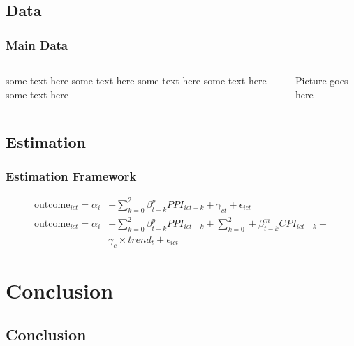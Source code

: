 \documentclass[11pt, aspectratio=169]{beamer}
\begin{document}
\subsection{Data}
\begin{frame}[label=data_slide]\frametitle{Main Data}

\begin{columns}
\begin{column}{0.6\textwidth}
\begin{wideitemize}
   \item some text here some text here some text here some text here
   some text here
   \item \hyperlink{appendix_end}{}
\end{wideitemize}
\end{column}
\begin{column}{0.4\textwidth}
    \begin{center}
    Picture goes here
     \end{center}
\end{column}
\end{columns}
\end{frame}

\subsection{Estimation}
\begin{frame}\frametitle{Estimation Framework}
\begin{align*}
\text{outcome}_{ict} = \alpha_i & + \sum_{k=0}^2 \beta_{t-k}^p
PPI_{ict-k} + \gamma_{ct} + \epsilon_{ict} \\
\text{outcome}_{ict} = \alpha_i & + \sum_{k=0}^2 \beta_{t-k}^p PPI_{ict-k} +
\sum_{k=0}^2 + \beta_{t-k}^m CPI_{ict-k} + \\ & \gamma_{c}\times
trend_t + \epsilon_{ict}
\end{align*}
\end{frame}
\section{Conclusion}
\subsection{Conclusion}
\end{document}

